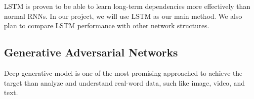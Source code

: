 LSTM is proven to be able to learn long-term dependencies more effectively than normal RNNs. In our project, we will use LSTM as our main method. We also plan to compare LSTM performance with other network structures.

\subsection{Generative Adversarial Networks}
Deep generative model is one of the most promising approached to achieve the target than analyze and understand real-word data, such like image, video, and text. 
